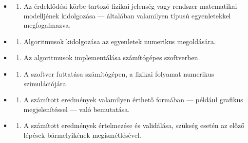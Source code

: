 \documentclass[
  magyar,
  11pt]{article}
\providecommand{\tightlist}{%
  \setlength{\itemsep}{0pt}\setlength{\parskip}{0pt}}
\begin{document}
\begin{itemize}
\tightlist
\item
  \begin{enumerate}
  \def\labelenumi{\arabic{enumi}.}
  \tightlist
  \item
    Az érdeklődési körbe tartozó fizikai jelenség vagy rendszer
    matematikai modelljének kidolgozása --- általában valamilyen típusú
    egyenletekkel megfogalmazva.
  \end{enumerate}
\item
  \begin{enumerate}
  \def\labelenumi{\arabic{enumi}.}
  \setcounter{enumi}{1}
  \tightlist
  \item
    Algoritmusok kidolgozása az egyenletek numerikus megoldására.
  \end{enumerate}
\item
  \begin{enumerate}
  \def\labelenumi{\arabic{enumi}.}
  \setcounter{enumi}{2}
  \tightlist
  \item
    Az algoritmusok implementálása számítógépes szoftverben.
  \end{enumerate}
\item
  \begin{enumerate}
  \def\labelenumi{\arabic{enumi}.}
  \setcounter{enumi}{3}
  \tightlist
  \item
    A szoftver futtatása számítógépen, a fizikai folyamat numerikus
    szimulációjára.
  \end{enumerate}
\item
  \begin{enumerate}
  \def\labelenumi{\arabic{enumi}.}
  \setcounter{enumi}{4}
  \tightlist
  \item
    A számított eredmények valamilyen érthető formában --- például
    grafikus megjelenítéssel --- való bemutatása.
  \end{enumerate}
\item
  \begin{enumerate}
  \def\labelenumi{\arabic{enumi}.}
  \setcounter{enumi}{5}
  \tightlist
  \item
    A számított eredmények értelmezése és validálása, szükség esetén az
    előző lépések bármelyikének megismétlésével.
  \end{enumerate}
\end{itemize}
\end{document}
